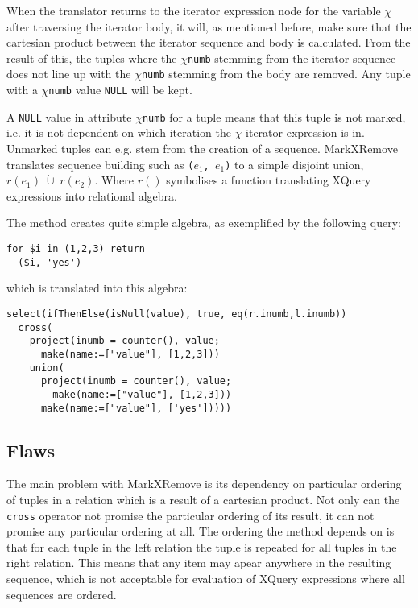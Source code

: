 When the translator returns to the iterator expression node for the variable $\chi$ after traversing the iterator
body, it will, as mentioned before, make sure that the cartesian product between the iterator sequence and body is
calculated. From the result of this, the tuples where the $\chi$\texttt{numb} stemming from the iterator
sequence does not line up with the $\chi$\texttt{numb} stemming from the body are removed. Any tuple with a
$\chi$\texttt{numb} value \texttt{NULL} will be kept.

A \texttt{NULL} value in attribute $\chi$\texttt{numb} for a tuple means that this tuple is not marked, i.e. it is
not dependent on which iteration the $\chi$ iterator expression is in. Unmarked
tuples can e.g. stem from the creation of a sequence. MarkXRemove translates sequence building such as \texttt{(}$e_{1}$\texttt{,
}$e_{1}$\texttt{)} to a simple disjoint union, $r(e_{1})\;\dot\cup\;r(e_{2})$. Where $r()$ symbolises a function
translating XQuery expressions into relational algebra.

The method creates quite simple algebra, as exemplified by the following query:
\begin{Verbatim}
for $i in (1,2,3) return 
  ($i, 'yes')
\end{Verbatim}

which is translated into this algebra:

\begin{Verbatim}
select(ifThenElse(isNull(value), true, eq(r.inumb,l.inumb))
  cross(
    project(inumb = counter(), value;
      make(name:=["value"], [1,2,3]))
    union(
      project(inumb = counter(), value;
        make(name:=["value"], [1,2,3]))
      make(name:=["value"], ['yes']))))
\end{Verbatim} 

\subsection{Flaws}
\label{sect:trans:mxr:flaws}
The main problem with MarkXRemove is its dependency on particular ordering of
tuples in a relation which is a result of a cartesian product. Not only can the \texttt{cross} operator not promise the particular ordering
of its result, it can not promise any particular ordering at all. The ordering the method depends on is that for
each tuple in the left relation the tuple is repeated for all tuples in the right relation. This means that any
item may apear anywhere in the resulting sequence, which is not acceptable for evaluation of XQuery expressions
where all sequences are ordered.


